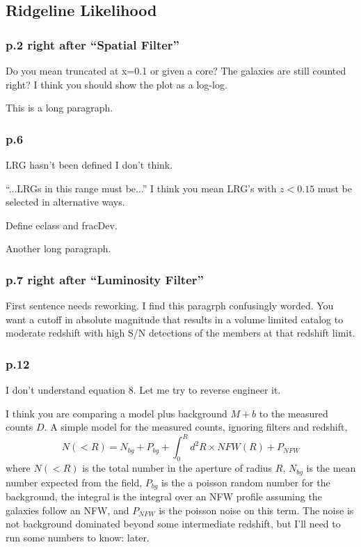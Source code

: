 \documentclass[12pt]{article}
\begin{document}
\subsection{Ridgeline Likelihood}

\subsubsection*{p.2 right after ``Spatial Filter''}

Do you mean truncated at x=0.1 or given a core? The galaxies are still counted
right?  I think you should show the plot as a log-log.

This is a long paragraph.
\subsubsection*{p.6}

LRG hasn't been defined I don't think.  

``...LRGs in this range must be...'' I think you mean LRG's with $z < 0.15$
must be selected in alternative ways.  

Define eclass and fracDev.

Another long paragraph.

\subsubsection*{p.7 right after ``Luminosity Filter''}

First sentence needs reworking.  I find this paragrph confusingly worded.  You
want a cutoff in absolute magnitude that results in a volume limited catalog to
moderate redshift with high S/N detections of the members at that redshift
limit.

\subsubsection*{p.12}

I don't understand equation 8.  Let me try to reverse engineer it.

I think you are comparing a model plus background $M + b$ to the measured
counts $D$. A simple model for the measured counts, ignoring filters and
redshift,
\begin{equation}
N(<R) = N_{bg} + P_{bg} + \int_{0}^{R} d^{2}R \times NFW(R)   + P_{NFW}
\end{equation}
where $N(<R)$ is the total number in the aperture of radius $R$, 
$N_{bg}$ is the mean number expected from the field, $P_{bg}$ is the
a poisson random number for the background, the integral is the
integral over an NFW profile assuming the galaxies follow an NFW, 
and $P_{NFW}$ is the poisson noise on this term.  The noise is not background 
dominated beyond some intermediate redshift, but I'll need to run
some numbers to know: later.
\end{document}
